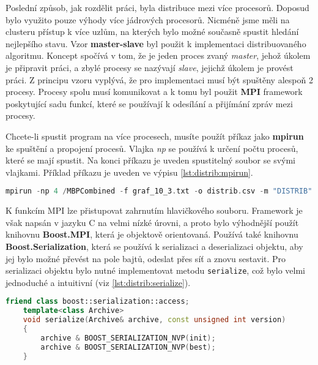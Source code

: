 Poslední způsob, jak rozdělit práci, byla distribuce mezi více procesorů.
Doposud bylo využito pouze výhody více jádrových procesorů.
Nicméně jsme měli na clusteru přístup k více uzlům, na kterých bylo možné současně spustit hledání nejlepšího stavu.
Vzor \textbf{master-slave} byl použit k implementaci distribuovaného algoritmu.
Koncept spočívá v tom, že je jeden proces zvaný \textit{master}, jehož úkolem je připravit práci, a zbylé procesy se nazývají \textit{slave}, jejichž úkolem je provést práci.
Z principu vzoru vyplývá, že pro implementaci musí být spuštěny alespoň 2 procesy.
Procesy spolu musí komunikovat a k tomu byl použit \textbf{MPI} framework poskytující sadu funkcí, které se používají k odesílání a přijímání zpráv mezi procesy.

Chcete-li spustit program na více procesech, musíte použít příkaz jako \textbf{mpirun} ke spuštění a propojení procesů.
Vlajka \textit{np} se používá k určení počtu procesů, které se mají spustit.
Na konci příkazu je uveden spustitelný soubor se svými vlajkami.
Příklad příkazu je uveden ve výpisu \ref{lst:distrib:mpirun}.

\begin{lstlisting}[language=C++, label={lst:distrib:mpirun}, title={Příklad použití příkazu mpirun}]
mpirun -np 4 /MBPCombined -f graf_10_3.txt -o distrib.csv -m "DISTRIB" -dm 4 -ds 4 -t 3
\end{lstlisting}

K funkcím MPI lze přistupovat zahrnutím hlavičkového souboru.
Framework je však napsán v jazyku C na velmi nízké úrovni, a proto bylo výhodnější použít knihovnu \textbf{Boost.MPI}, která je objektově orientovaná.
Používá také knihovnu \textbf{Boost.Serialization}, která se používá k serializaci a deserializaci objektu, aby jej bylo možné převést na pole bajtů, odeslat přes síť a znovu sestavit.
Pro serializaci objektu bylo nutné implementovat metodu \texttt{serialize}, což bylo velmi jednoduché a intuitivní (viz \ref{lst:distrib:serialize}).

\begin{lstlisting}[language=C++, label={lst:distrib:serialize}, title={Příklad implementace metody serialize}]
    friend class boost::serialization::access;
    template<class Archive>
    void serialize(Archive& archive, const unsigned int version)
    {
        archive & BOOST_SERIALIZATION_NVP(init);
        archive & BOOST_SERIALIZATION_NVP(best);
    }
\end{lstlisting}

